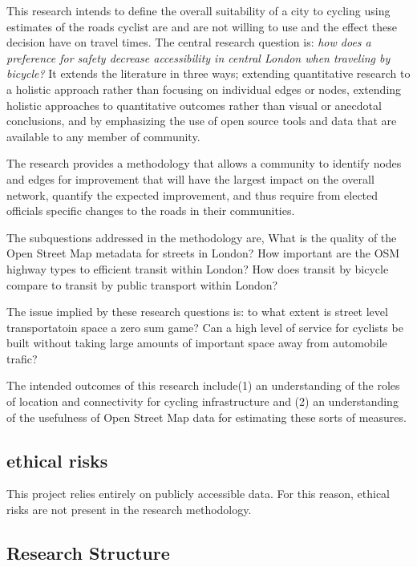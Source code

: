 \documentclass[11pt]{article} %
\begin{document}
This research intends to define the overall suitability of a city to cycling using estimates of the roads cyclist are and are not willing to use and the effect these decision have on travel times. The central research question is: \textit{how does a preference for safety decrease accessibility in central London when traveling by bicycle?} It extends the literature in three ways; extending quantitative research to a holistic approach rather than focusing on individual edges or nodes, extending holistic approaches to quantitative outcomes rather than visual or anecdotal conclusions, and by emphasizing the use of open source tools and data that are available to any member of community. 

The research provides a methodology that allows a community to identify nodes and edges for improvement that will have the largest impact on the overall network, quantify the expected improvement, and thus require from elected officials specific changes to the roads in their communities. 

The subquestions addressed in the methodology are, What is the quality of the Open Street Map metadata for streets in London? How important are the OSM highway types to efficient transit within London? How does transit by bicycle compare to transit by public transport within London? 

The issue implied by these research questions is: to what extent is street level transportatoin space a zero sum game? Can a high level of service for cyclists be built without taking large amounts of important space away from automobile trafic? 

The intended outcomes of this research include(1) an understanding of the roles of location and connectivity for cycling infrastructure and (2) an understanding of the usefulness of Open Street Map data for estimating these sorts of measures. 


\subsection{ethical risks}

This project relies entirely on publicly accessible data. For this reason, ethical risks are not present in the research methodology.  



\subsection{Research Structure}
\end{document}
